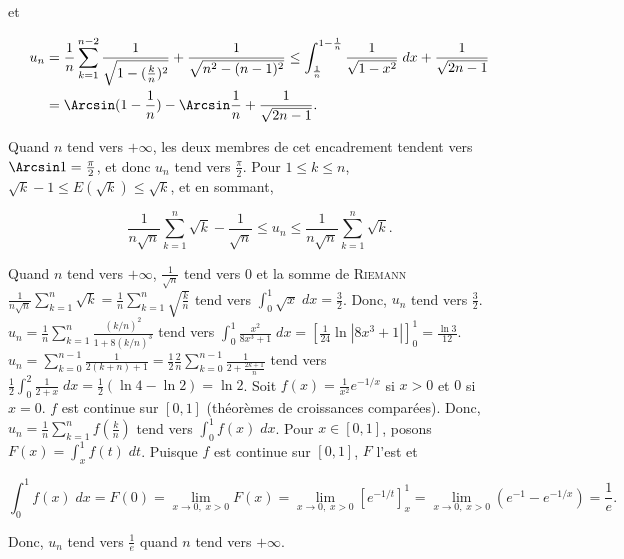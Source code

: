 {{et 

\begin{align*}\ensuremath
u_n&=\frac{1}{n}\sum_{k=1}^{n-2}\frac{1}{\sqrt{1-(\frac{k}{n})^2}}+\frac{1}{\sqrt{n^2-(n-1)^2}}\leq\int_{\frac{1}{n}}^{1-\frac{1}{n}}\frac{1}{\sqrt{1-x^2}}\;dx+\frac{1}{\sqrt{2n-1}}\\
 &=\Arcsin(1-\frac{1}{n})-\Arcsin\frac{1}{n}+\frac{1}{\sqrt{2n-1}}.
\end{align*}

Quand $n$ tend vers $+\infty$, les deux membres de cet encadrement tendent vers $\Arcsin1=\frac{\pi}{2}$, et donc $u_n$ tend vers $\frac{\pi}{2}$.
Pour $1\leq k\leq n$, $\sqrt{k}-1\leq E(\sqrt{k})\leq \sqrt{k}$, et en sommant,

$$\frac{1}{n\sqrt{n}}\sum_{k=1}^{n}\sqrt{k}-\frac{1}{\sqrt{n}}\leq u_n\leq \frac{1}{n\sqrt{n}}\sum_{k=1}^{n}\sqrt{k}.$$

Quand $n$ tend vers $+\infty$, $\frac{1}{\sqrt{n}}$ tend vers $0$ et la somme de \textsc{Riemann} $\frac{1}{n\sqrt{n}}\sum_{k=1}^{n}\sqrt{k}=\frac{1}{n}\sum_{k=1}^{n}\sqrt{\frac{k}{n}}$ tend vers $\int_{0}^{1}\sqrt{x}\;dx=\frac{3}{2}$. Donc, $u_n$ tend vers $\frac{3}{2}$.
$u_n=\frac{1}{n}\sum_{k=1}^{n}\frac{(k/n)^2}{1+8(k/n)^3}$ tend vers $\int_{0}^{1}\frac{x^2}{8x^3+1}\;dx=\left[\frac{1}{24}\ln|8x^3+1|\right]_{0}^{1}=\frac{\ln3}{12}$.
$u_n=\sum_{k=0}^{n-1}\frac{1}{2(k+n)+1}=\frac{1}{2}\frac{2}{n}\sum_{k=0}^{n-1}\frac{1}{2+\frac{2k+1}{n}}$ tend vers $\frac{1}{2}\int_{0}^{2}\frac{1}{2+x}\;dx=\frac{1}{2}(\ln4-\ln2)=\ln2$.
Soit $f(x)=\frac{1}{x^2}e^{-1/x}$ si $x>0$ et $0$ si $x=0$. $f$ est continue sur $[0,1]$ (théorèmes de croissances comparées). Donc, $u_n=\frac{1}{n}\sum_{k=1}^{n}f(\frac{k}{n})$ tend vers $\int_{0}^{1}f(x)\;dx$. Pour $x\in[0,1]$, posons $F(x)=\int_{x}^{1}f(t)\;dt$. Puisque $f$ est continue sur $[0,1]$, $F$ l'est et

$$\int_{0}^{1}f(x)\;dx=F(0)=\lim_{x\rightarrow 0,\;x>0}F(x)=\lim_{x\rightarrow 0,\;x>0}\left[e^{-1/t}\right]_{x}^{1}=\lim_{x\rightarrow 0,\;x>0}(e^{-1}-e^{-1/x})=\frac{1}{e}.$$

Donc, $u_n$ tend vers $\frac{1}{e}$ quand $n$ tend vers $+\infty$.
}
}
